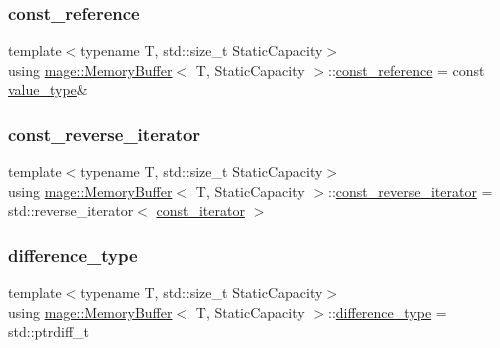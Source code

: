 \subsubsection{\texorpdfstring{const\+\_\+reference}{const\_reference}}
{\footnotesize\ttfamily template$<$typename T, std\+::size\+\_\+t Static\+Capacity$>$ \\
using \mbox{\hyperlink{classmage_1_1_memory_buffer}{mage\+::\+Memory\+Buffer}}$<$ T, Static\+Capacity $>$\+::\mbox{\hyperlink{classmage_1_1_memory_buffer_aa54883bc0cb483fef570663344f85bb7}{const\+\_\+reference}} =  const \mbox{\hyperlink{classmage_1_1_memory_buffer_a3f8a036eaa59236b80342ba3a251c9e8}{value\+\_\+type}}\&}

\mbox{\label{classmage_1_1_memory_buffer_a95188e283a195d9aa2730deb6b1c1a79}} 
\subsubsection{\texorpdfstring{const\+\_\+reverse\+\_\+iterator}{const\_reverse\_iterator}}
{\footnotesize\ttfamily template$<$typename T, std\+::size\+\_\+t Static\+Capacity$>$ \\
using \mbox{\hyperlink{classmage_1_1_memory_buffer}{mage\+::\+Memory\+Buffer}}$<$ T, Static\+Capacity $>$\+::\mbox{\hyperlink{classmage_1_1_memory_buffer_a95188e283a195d9aa2730deb6b1c1a79}{const\+\_\+reverse\+\_\+iterator}} =  std\+::reverse\+\_\+iterator$<$ \mbox{\hyperlink{classmage_1_1_memory_buffer_a3cc14c15660c36d35195e1836db33ee7}{const\+\_\+iterator}} $>$}

\mbox{\label{classmage_1_1_memory_buffer_a3cb4544fa953bdf88b90f1bf7ef6884a}} 
\subsubsection{\texorpdfstring{difference\+\_\+type}{difference\_type}}
{\footnotesize\ttfamily template$<$typename T, std\+::size\+\_\+t Static\+Capacity$>$ \\
using \mbox{\hyperlink{classmage_1_1_memory_buffer}{mage\+::\+Memory\+Buffer}}$<$ T, Static\+Capacity $>$\+::\mbox{\hyperlink{classmage_1_1_memory_buffer_a3cb4544fa953bdf88b90f1bf7ef6884a}{difference\+\_\+type}} =  std\+::ptrdiff\+\_\+t}

